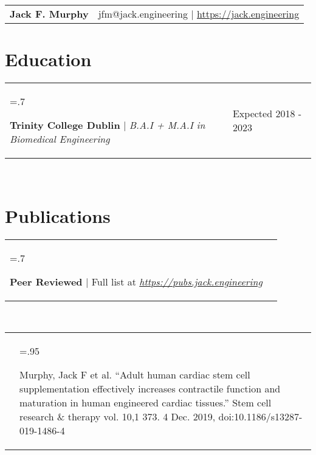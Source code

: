 \documentclass[letterpaper,11pt]{article}
\newcommand{\projHeadings}[2]{
    \begin{tabularx}{\textwidth} {>{\hsize=.7\textwidth\raggedright\arraybackslash}X 
   >{\raggedleft\arraybackslash}X}
      #1 & \small#2 \\
    \end{tabularx}
    \\
}
\newcommand{\projitems}[1]{
    \begin{tabularx}{\textwidth} {>{\raggedleft\arraybackslash}X | >{\hsize=.95\textwidth\raggedright\arraybackslash}X}
      & \small#1 \\
    \end{tabularx}
     \\
}
\newcommand{\heading}[3]{
    \hspace{-9mm}
    \begin{tabular}{p{.4\textwidth} >{\raggedleft}p{.57\textwidth}}
        \textbf{\Huge{#1}}\vspace{5mm} & #2 $|$ #3 \\
    \end{tabular}
}
\begin{document}
\heading
    {Jack F. Murphy}
    {jfm@jack.engineering}
    {\href{https://jack.engineering}{https://jack.engineering}}

\section*{Education}
    \projHeadings
          {\textbf{Trinity College Dublin} $|$ \emph{B.A.I + M.A.I in Biomedical Engineering}}
          {Expected 2018 - 2023}
          {}

\section*{Publications}
    \projHeadings
          {\textbf{Peer Reviewed} $|$ Full list at \emph{\href{https://pubs.jack.engineering}{https://pubs.jack.engineering}}}
          {}
         \projitems
            {Murphy, Jack F et al. “Adult human cardiac stem cell supplementation effectively increases contractile function and maturation in human engineered cardiac tissues.” Stem cell research \& therapy vol. 10,1 373. 4 Dec. 2019, doi:10.1186/s13287-019-1486-4}

\end{document}
